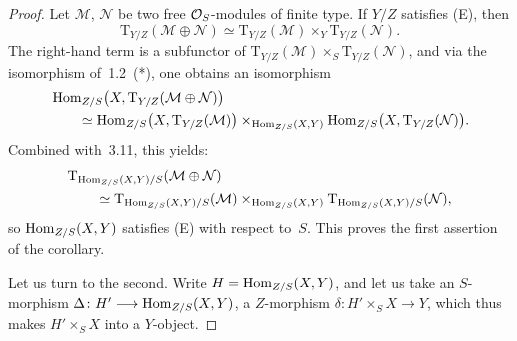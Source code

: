 \begin{proof}
Let \(\mathcal{M}\), \(\mathcal{N}\) be two free \(\mathcal{O}_S\)-modules of finite
type. If \(Y/Z\) satisfies \textup{(E)}, then
\[
\mathrm{T}_{Y/Z}(\mathcal{M}\oplus\mathcal{N})
\simeq
\mathrm{T}_{Y/Z}(\mathcal{M})\times_{Y}\mathrm{T}_{Y/Z}(\mathcal{N}).
\]
The right-hand term is a subfunctor of
\(\mathrm{T}_{Y/Z}(\mathcal{M})\times_{S}\mathrm{T}_{Y/Z}(\mathcal{N})\), and
via the isomorphism of~1.2~(*), one obtains an isomorphism
\begin{align*}
&\operatorname{Hom}_{Z/S}\bigl(X,\mathrm{T}_{Y/Z}(\mathcal{M}\oplus\mathcal{N})\bigr)\\
&\qquad\simeq
\operatorname{Hom}_{Z/S}\bigl(X,\mathrm{T}_{Y/Z}(\mathcal{M})\bigr)
\times_{\operatorname{Hom}_{Z/S}(X,Y)}
\operatorname{Hom}_{Z/S}\bigl(X,\mathrm{T}_{Y/Z}(\mathcal{N})\bigr).
\end{align*}
Combined with~3.11, this yields:
\begin{align*}
&\mathrm{T}_{\operatorname{Hom}_{Z/S}(X,Y)/S}(\mathcal{M}\oplus\mathcal{N})\\
&\qquad\simeq
\mathrm{T}_{\operatorname{Hom}_{Z/S}(X,Y)/S}(\mathcal{M})
\times_{\operatorname{Hom}_{Z/S}(X,Y)}
\mathrm{T}_{\operatorname{Hom}_{Z/S}(X,Y)/S}(\mathcal{N}),
\end{align*}
so \(\operatorname{Hom}_{Z/S}(X,Y)\) satisfies \textup{(E)} with respect to~\(S\). This
proves the first assertion of the corollary.

Let us turn to the second. Write \(H=\operatorname{Hom}_{Z/S}(X,Y)\), and let us take an
\(S\)-morphism \(\Delta\colon H'\longrightarrow\operatorname{Hom}_{Z/S}(X,Y)\), \ie a \(Z\)-morphism
\(\delta\colon H'\times_{S}X\to Y\), which thus makes \(H'\times_{S}X\) into
a \(Y\)-object.


\end{proof}
